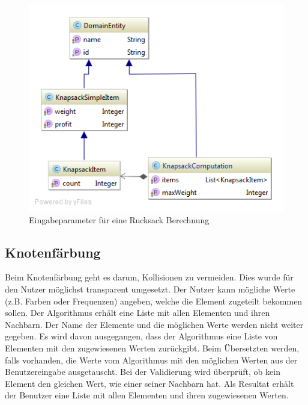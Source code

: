 \begin{figure}[h]
\centering
\includegraphics[scale=0.5]{images/probleme/knapsack.png}
\caption[Eingabeparameter für eine Rucksack Berechnung]{Eingabeparameter für eine Rucksack Berechnung \selfmade{}}
\label{fig:knapsack_input}
\end{figure}

\FloatBarrier

%
%
%
%

\subsection{Knotenfärbung}
Beim Knotenfärbung geht es darum, Kollisionen zu vermeiden. Dies wurde für den Nutzer möglichst transparent umgesetzt. Der Nutzer kann mögliche Werte (z.B. Farben oder 
Frequenzen) angeben, welche die Element zugeteilt bekommen sollen. Der Algorithmus erhält eine Liste mit allen Elementen und ihren Nachbarn. Der Name der Elemente und die möglichen 
Werte werden nicht weiter gegeben. Es wird davon ausgegangen, dass der Algorithmus eine Liste von Elementen mit den zugewiesenen Werten zurückgibt. Beim Übersetzten werden, falls 
vorhanden, die Werte vom Algorithmus mit den möglichen Werten aus der Benutzereingabe ausgetauscht. Bei der Validierung wird überprüft, ob kein Element den gleichen Wert, wie einer 
seiner Nachbarn hat. Als Resultat erhält der Benutzer eine Liste mit allen Elementen und ihren zugewiesenen Werten.

